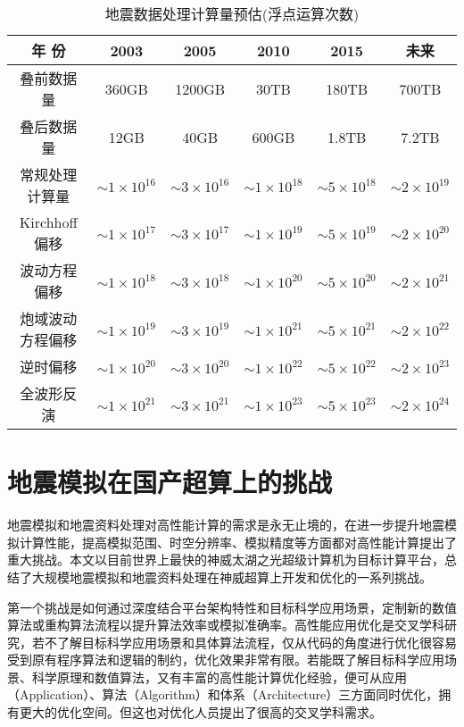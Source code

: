 \begin{table}[ht]
\centering
\caption{地震数据处理计算量预估(浮点运算次数)}
\label{tb:oilcomputing}
\begin{tabular}{cccccc}
\hline\hline
年    份      & 2003         & 2005         & 2010         & 2015         & 未来           \\ \hline
叠前数据量       & 360GB        & 1200GB       & 30TB         & 180TB        & 700TB        \\ \hline
叠后数据量       & 12GB         & 40GB         & 600GB        & 1.8TB        & 7.2TB        \\ \hline
常规处理计算量   & $\sim1\times10^{16}$ & $\sim3\times10^{16}$ & $\sim1\times10^{18}$ & $\sim5\times10^{18}$ & $\sim2\times10^{19}$ \\ \hline
Kirchhoff偏移    & $\sim1\times10^{17}$ & $\sim3\times10^{17}$ & $\sim1\times10^{19}$ & $\sim5\times10^{19}$ & $\sim2\times10^{20}$ \\ \hline
波动方程偏移     & $\sim1\times10^{18}$ & $\sim3\times10^{18}$ & $\sim1\times10^{20}$ & $\sim5\times10^{20}$ & $\sim2\times10^{21}$ \\ \hline
炮域波动方程偏移 & $\sim1\times10^{19}$ & $\sim3\times10^{19}$ & $\sim1\times10^{21}$ & $\sim5\times10^{21}$ & $\sim2\times10^{22}$ \\ \hline
逆时偏移         & $\sim1\times10^{20}$ & $\sim3\times10^{20}$ & $\sim1\times10^{22}$ & $\sim5\times10^{22}$ & $\sim2\times10^{23}$ \\ \hline
全波形反演       & $\sim1\times10^{21}$ & $\sim3\times10^{21}$ & $\sim1\times10^{23}$ & $\sim5\times10^{23}$ & $\sim2\times10^{24}$ \\ \hline
\hline
\end{tabular}
\end{table}

\section{地震模拟在国产超算上的挑战}

地震模拟和地震资料处理对高性能计算的需求是永无止境的，在进一步提升地震模拟计算性能，提高模拟范围、时空分辨率、模拟精度等方面都对高性能计算提出了重大挑战。本文以目前世界上最快的神威太湖之光超级计算机为目标计算平台，总结了大规模地震模拟和地震资料处理在神威超算上开发和优化的一系列挑战。

第一个挑战是如何通过深度结合平台架构特性和目标科学应用场景，定制新的数值算法或重构算法流程以提升算法效率或模拟准确率。高性能应用优化是交叉学科研究，若不了解目标科学应用场景和具体算法流程，仅从代码的角度进行优化很容易受到原有程序算法和逻辑的制约，优化效果非常有限。若能既了解目标科学应用场景、科学原理和数值算法，又有丰富的高性能计算优化经验，便可从应用（Application）、算法（Algorithm）和体系（Architecture）三方面同时优化，拥有更大的优化空间。但这也对优化人员提出了很高的交叉学科需求。

